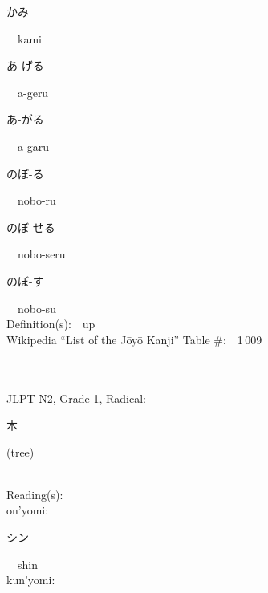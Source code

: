 \begin{multicols}{2}
{\hspace*{2em}}{\begin{CJK}{UTF8}{min} かみ \end{CJK}}\ \ kami\ \ \\
{\hspace*{2em}}{\begin{CJK}{UTF8}{min} あ-げる \end{CJK}}\ \ a-geru\ \ \\
{\hspace*{2em}}{\begin{CJK}{UTF8}{min} あ-がる \end{CJK}}\ \ a-garu\ \ \\
{\hspace*{2em}}{\begin{CJK}{UTF8}{min} のぼ-る \end{CJK}}\ \ nobo-ru\ \ \\
{\hspace*{2em}}{\begin{CJK}{UTF8}{min} のぼ-せる \end{CJK}}\ \ nobo-seru\ \ \\
{\hspace*{2em}}{\begin{CJK}{UTF8}{min} のぼ-す \end{CJK}}\ \ nobo-su\ \ \\
Definition(s):\ \ up \\
Wikipedia ``List of the J\=oy\=o Kanji'' Table \#:\ \ 1\,009 \\
\ \ \\
{\fontsize{34pt}{40pt}  }\ \ \\  %
{JLPT N2, Grade 1, Radical:\ \ {\begin{CJK}{UTF8}{min} 木 \end{CJK}} (tree) } \\
Reading(s):\ \ \\
{\hspace*{1em}}on'yomi:\ \ \\
{\hspace*{2em}}{\begin{CJK}{UTF8}{min} シン \end{CJK}}\ \ shin\ \ \\
{\hspace*{1em}}kun'yomi:\ \ \\

\end{multicols}
